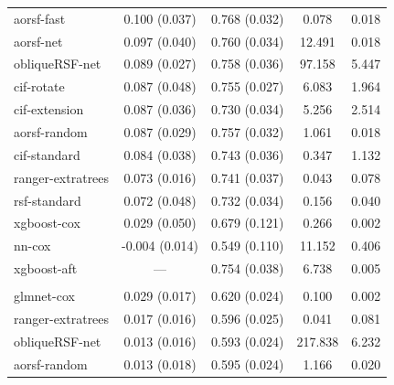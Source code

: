 \documentclass[twoside,11pt]{article}\usepackage[]{graphicx}\usepackage[]{xcolor}
\newenvironment{knitrout}{}{} %
\begin{document}
\begin{knitrout}
\begin{longtable}[t]{lcccc}
\hspace{1em}aorsf-fast & 0.100 (0.037) & 0.768 (0.032) & 0.078 & 0.018\\
\hspace{1em}aorsf-net & 0.097 (0.040) & 0.760 (0.034) & 12.491 & 0.018\\
\hspace{1em}obliqueRSF-net & 0.089 (0.027) & 0.758 (0.036) & 97.158 & 5.447\\
\hspace{1em}cif-rotate & 0.087 (0.048) & 0.755 (0.027) & 6.083 & 1.964\\
\hspace{1em}cif-extension & 0.087 (0.036) & 0.730 (0.034) & 5.256 & 2.514\\
\hspace{1em}aorsf-random & 0.087 (0.029) & 0.757 (0.032) & 1.061 & 0.018\\
\hspace{1em}cif-standard & 0.084 (0.038) & 0.743 (0.036) & 0.347 & 1.132\\
\hspace{1em}ranger-extratrees & 0.073 (0.016) & 0.741 (0.037) & 0.043 & 0.078\\
\hspace{1em}rsf-standard & 0.072 (0.048) & 0.732 (0.034) & 0.156 & 0.040\\
\hspace{1em}xgboost-cox & 0.029 (0.050) & 0.679 (0.121) & 0.266 & 0.002\\
\hspace{1em}nn-cox & -0.004 (0.014) & 0.549 (0.110) & 11.152 & 0.406\\
\hspace{1em}xgboost-aft & --- & 0.754 (0.038) & 6.738 & 0.005\\
\addlinespace[0.3em]
\multicolumn{5}{l}{\textit{\textbf{FCL; relapse, n = 541, p = 7}}}\\
\hline
\hspace{1em}glmnet-cox & 0.029 (0.017) & 0.620 (0.024) & 0.100 & 0.002\\
\hspace{1em}ranger-extratrees & 0.017 (0.016) & 0.596 (0.025) & 0.041 & 0.081\\
\hspace{1em}obliqueRSF-net & 0.013 (0.016) & 0.593 (0.024) & 217.838 & 6.232\\
\hspace{1em}aorsf-random & 0.013 (0.018) & 0.595 (0.024) & 1.166 & 0.020\\

\end{longtable}
\end{knitrout}
\end{document}
